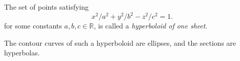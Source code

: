 \documentclass{ximera}
\begin{document}
\begin{example}
The set of points satisfying
\[
x^2/a^2 + y^2/b^2 - z^2/c^2 =1.
\]
for some constants $a,b,c\in\mathbb{R}$, is called a \emph{hyperboloid of one sheet}.

\begin{image}
\end{image}

The contour curves of such a hyperboloid are ellipses, and the sections are hyperbolas.
\end{example}
\end{document}
